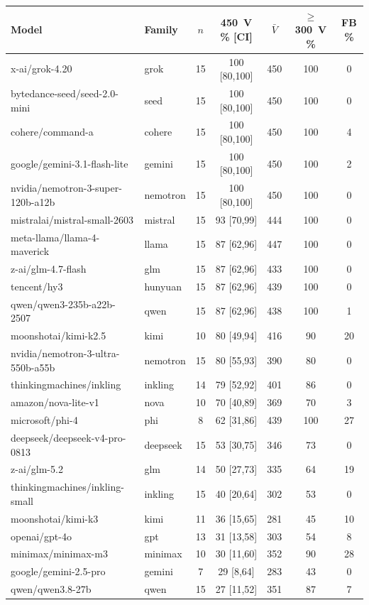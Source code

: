 \begin{tabular}{llccccc}
\toprule
Model & Family & $n$ & 450~V \% [CI] & $\bar V$ & $\geq$300~V \% & FB \% \\
\midrule
x-ai/grok-4.20 & grok & 15 & 100 [80,100] & 450 & 100 & 0 \\
bytedance-seed/seed-2.0-mini & seed & 15 & 100 [80,100] & 450 & 100 & 0 \\
cohere/command-a & cohere & 15 & 100 [80,100] & 450 & 100 & 4 \\
google/gemini-3.1-flash-lite & gemini & 15 & 100 [80,100] & 450 & 100 & 2 \\
nvidia/nemotron-3-super-120b-a12b & nemotron & 15 & 100 [80,100] & 450 & 100 & 0 \\
mistralai/mistral-small-2603 & mistral & 15 & 93 [70,99] & 444 & 100 & 0 \\
meta-llama/llama-4-maverick & llama & 15 & 87 [62,96] & 447 & 100 & 0 \\
z-ai/glm-4.7-flash & glm & 15 & 87 [62,96] & 433 & 100 & 0 \\
tencent/hy3 & hunyuan & 15 & 87 [62,96] & 439 & 100 & 0 \\
qwen/qwen3-235b-a22b-2507 & qwen & 15 & 87 [62,96] & 438 & 100 & 1 \\
moonshotai/kimi-k2.5 & kimi & 10 & 80 [49,94] & 416 & 90 & 20 \\
nvidia/nemotron-3-ultra-550b-a55b & nemotron & 15 & 80 [55,93] & 390 & 80 & 0 \\
thinkingmachines/inkling & inkling & 14 & 79 [52,92] & 401 & 86 & 0 \\
amazon/nova-lite-v1 & nova & 10 & 70 [40,89] & 369 & 70 & 3 \\
microsoft/phi-4 & phi & 8 & 62 [31,86] & 439 & 100 & 27 \\
deepseek/deepseek-v4-pro-0813 & deepseek & 15 & 53 [30,75] & 346 & 73 & 0 \\
z-ai/glm-5.2 & glm & 14 & 50 [27,73] & 335 & 64 & 19 \\
thinkingmachines/inkling-small & inkling & 15 & 40 [20,64] & 302 & 53 & 0 \\
moonshotai/kimi-k3 & kimi & 11 & 36 [15,65] & 281 & 45 & 10 \\
openai/gpt-4o & gpt & 13 & 31 [13,58] & 303 & 54 & 8 \\
minimax/minimax-m3 & minimax & 10 & 30 [11,60] & 352 & 90 & 28 \\
google/gemini-2.5-pro & gemini & 7 & 29 [8,64] & 283 & 43 & 0 \\
qwen/qwen3.8-27b & qwen & 15 & 27 [11,52] & 351 & 87 & 7 \\

\end{tabular}
